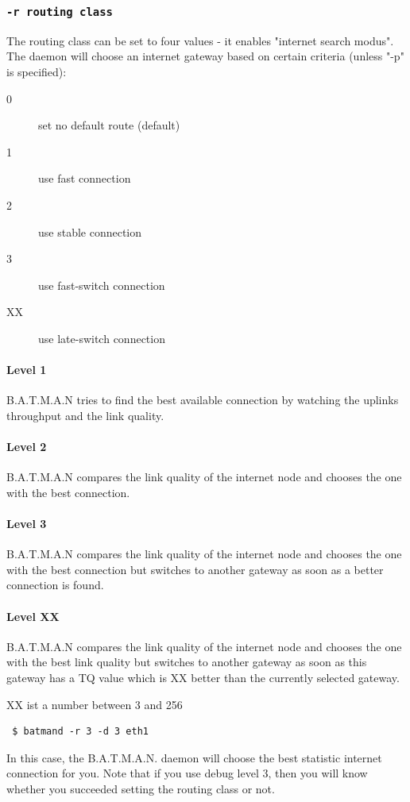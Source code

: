 \documentclass[
	12pt,
	a4paper,
	twoside,
	english,
	headsepline,
	footnosepline,
	automark,
	normalheadings,
	openany,
	cleardoubleplain,
	abstracton,
	idxtotoc,
	liststotoc,
	bibtotoc,
 	BCOR8mm,
]{scrartcl}
\newcommand{\subsubsectionttt}[1]{\subsubsection{\texttt{#1}}}
\begin{document}
\subsubsectionttt{-r routing class}
The routing class can be set to four values - it enables "internet search
modus". The daemon will choose an internet gateway based on certain criteria
(unless "-p" is specified):
\begin{description}
\item[0] set no default route (default)
\item[1] use fast connection
\item[2] use stable connection
\item[3] use fast-switch connection
\item[XX] use late-switch connection
\end{description}

\paragraph*{Level 1}
B.A.T.M.A.N tries to find the best available connection by watching the uplinks
throughput and the link quality.

\paragraph*{Level 2}
B.A.T.M.A.N compares the link quality of the internet node and chooses the one
with the best connection.

\paragraph*{Level 3}
B.A.T.M.A.N compares the link quality of the internet node and chooses the one
with the best connection but switches to another gateway as soon as a better
connection is found.

\paragraph*{Level XX}
B.A.T.M.A.N compares the link quality of the internet node and chooses the one
with the best link quality but switches to another gateway as soon as this
gateway has a TQ value which is XX better than the currently selected gateway.

XX ist a number between 3 and 256

\begin{verbatim}
 $ batmand -r 3 -d 3 eth1
\end{verbatim}
In this case, the B.A.T.M.A.N. daemon will choose the best statistic internet
connection for you. Note that if you use debug level 3, then you will know
whether you succeeded setting the routing class or not.
\end{document}
